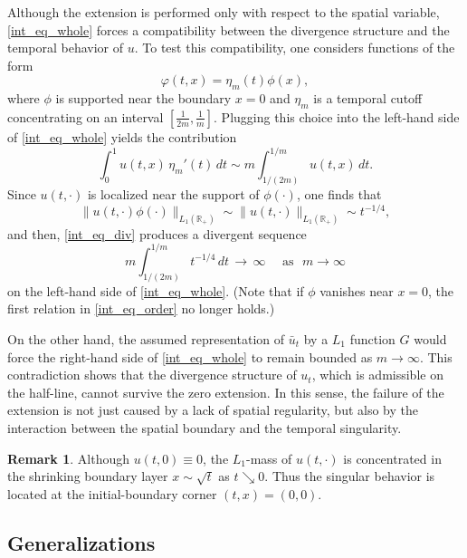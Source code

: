 \documentclass[reqno]{amsart}
\numberwithin{equation}{section}
\theoremstyle{plain}
\theoremstyle{definition}
\newtheorem{remark}[theorem]{Remark}
\def\bR{\mathbb{R}}
\begin{document}
Although the extension is performed only with respect to the spatial variable, \eqref{int_eq_whole} forces a compatibility between the divergence structure
and the temporal behavior of $u$.
To test this compatibility, one considers functions of the form
\[
\varphi(t,x)=\eta_m(t)\phi(x),
\]
where $\phi$ is supported near the boundary $x=0$ and $\eta_m$ is a temporal cutoff concentrating on an interval $[\tfrac{1}{2m}, \tfrac{1}{m}]$.
Plugging this choice into the left-hand side of
\eqref{int_eq_whole} yields the contribution
\begin{equation}
    \label{int_eq_div}
\int_{0}^{1} u(t,x)\,\eta_m'(t)\,dt \sim m \int_{1/(2m)}^{1/m} u(t,x)\,dt.
\end{equation}
Since $u(t, \cdot)$ is localized near the support of $\phi(\cdot)$, one finds that
\begin{equation}
    \label{int_eq_order}
 \|u(t, \cdot) \phi(\cdot)\|_{L_1(\bR_+)} \sim \|u(t, \cdot)\|_{L_1(\bR_+)} \sim t^{-1/4},
\end{equation}
and then, \eqref{int_eq_div} produces a divergent sequence
\[
m\int_{1/(2m)}^{1/m} t^{-1/4}\,dt \, \to \, \infty \quad \textrm{ as } \,\, m \to \infty
\]
on the left-hand side of \eqref{int_eq_whole}.
(Note that if $\phi$ vanishes near $x=0$, the first relation in \eqref{int_eq_order} no longer holds.)

On the other hand, the assumed representation of $\bar u_t$ by a $L_1$ function $G$ would force the right-hand side of \eqref{int_eq_whole} to remain bounded as $m \to \infty$.
This contradiction shows that the divergence structure of $u_t$, which is admissible on the half-line, cannot survive the zero extension.
In this sense, the failure of the extension is not just caused by a lack of spatial regularity, but also by the interaction between the spatial boundary and the temporal singularity.

\begin{remark}		\label{RMK_1}
Although $u(t,0)\equiv0$, the $L_1$-mass of $u(t,\cdot)$ is concentrated in the shrinking boundary layer $x\sim\sqrt t$ as $t\searrow0$.
Thus the singular behavior is located at the initial-boundary corner $(t,x)=(0,0)$.
\end{remark}


\subsection{Generalizations}			\label{S1_3}
\end{document}
